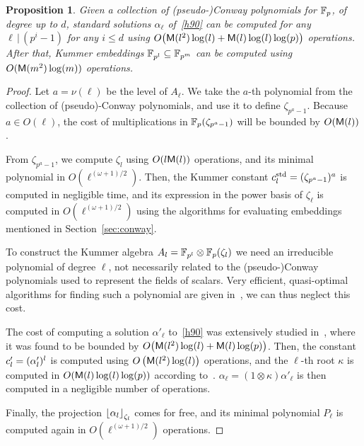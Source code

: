 \documentclass[sigconf]{acmart}
\newtheorem{proposition}[theorem]{Proposition}
\begin{document}
\begin{proposition}
  Given a collection of (pseudo-)Conway polynomials for $\mathbb{F}_p$, of
  degree up to $d$, standard solutions $\alpha_\ell$ of~\eqref{h90} can
  be computed for any $\ell\,|\,(p^i-1)$ for any $i\le d$ using
  $O\bigr(\mathsf{M}(l^2)\log(l) + \mathsf{M}(l)\log(l)\log(p)\bigl)$ %
  operations. %
  After that, Kummer embeddings $\mathbb{F}_{p^l}\subseteq\mathbb{F}_{p^m}$ can be
  computed using $O(\mathsf{M}(m^2)\log(m))$ operations.
\end{proposition}
\begin{proof}
  Let $a=\nu(\ell)$ be the level of $A_\ell$. We take the $a$-th
  polynomial from the collection of (pseudo)-Conway polynomials, and
  use it to define $\zeta_{p^a-1}$. %
  Because $a\in O(\ell)$, the cost of multiplications in
  $\mathbb{F}_p(\zeta_{p^a-1})$ will be bounded by $O(\mathsf{M}(l))$.

  From $\zeta_{p^a-1}$, we compute $\zeta_l$ using $O(l\mathsf{M}(l))$
  operations, and its minimal polynomial in
  $O(\ell^{(\omega+1)/2})$. %
  Then, the Kummer constant $c^{\mathrm{std}}_l=(\zeta_{p^a-1})^a$ is computed
  in negligible time, and its expression in the power basis of
  $\zeta_\ell$ is computed in $O(\ell^{(\omega+1)/2})$ using the
  algorithms for evaluating embeddings mentioned in
  Section~\ref{sec:conway}.

  To construct the Kummer algebra
  $A_l=\mathbb{F}_{p^l}\otimes\mathbb{F}_p(\zeta_l)$ we need an irreducible
  polynomial of degree $\ell$, not necessarily related to the
  (pseudo-)Conway polynomials used to represent the fields of
  scalars. %
  Very efficient, quasi-optimal algorithms for finding such a
  polynomial are given
  in~\cite{BoFlSaSc06,couveignes+lercier11,DeDoSc13}, we can thus
  neglect this cost.
  
  The cost of computing a solution $\alpha'_\ell$ to~\eqref{h90} was
  extensively studied in~\cite{brieulle2018computing}, where it was
  found to be bounded by
  $O\bigr(\mathsf{M}(l^2)\log(l) + \mathsf{M}(l)\log(p)\bigl)$. %
  Then, the constant $c'_l=(\alpha'_l)^l$ is computed using
  $O\left(\mathsf{M}(l^2)\log(l)\right)$ operations, and the $\ell$-th root
  $\kappa$ is computed in $O(\mathsf{M}(l)\log(l)\log(p))$ according
  to~\cite{brieulle2018computing}. %
  $\alpha_\ell=(1\otimes\kappa)\alpha'_\ell$ is then computed in a
  negligible number of operations.

  Finally, the projection $\left\lfloor \alpha_l \right\rfloor_{\zeta_l}$ comes for
  free, and its minimal polynomial $P_\ell$ is computed again in
  $O(\ell^{(\omega+1)/2})$ operations.


\end{proof}
\end{document}
